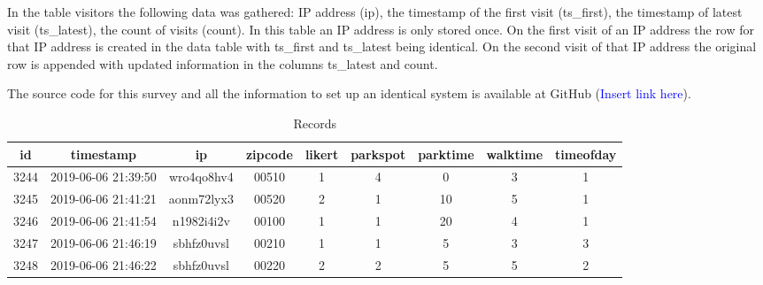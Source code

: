 In the table visitors the following data was gathered: IP address (ip), the timestamp of the first visit (ts\_first), the timestamp of latest visit (ts\_latest), the count of visits (count). In this table an IP address is only stored once. On the first visit of an IP address the row for that IP address is created in the data table with ts\_first and ts\_latest being identical. On the second visit of that IP address the original row is appended with updated information in the columns ts\_latest and count.

The source code for this survey and all the information to set up an identical system is available at GitHub (\textcolor{blue}{Insert link here}).

\begin{table}[!htbp] %
    \begin{adjustwidth}{-1cm}{-1cm} %
        \begin{centering}
            \begin{tabular}{|c c c c c c c c c|} 
                \hline
                id & timestamp & ip & zipcode & likert & parkspot & parktime & walktime & timeofday \\ [0.5ex] 
                \hline\hline
                3244 & 2019-06-06 21:39:50 & wro4qo8hv4 & 00510 & 1 & 4 & 0 & 3 & 1\\ [0.25ex]
                \hline
                3245 & 2019-06-06 21:41:21 & aonm72lyx3 & 00520 & 2 & 1 & 10 & 5 & 1 \\ [0.25ex] 
                \hline
                3246 & 2019-06-06 21:41:54 & n1982i4i2v & 00100 & 1 & 1 & 20 & 4 & 1 \\ [0.25ex] 
                \hline
                3247 & 2019-06-06 21:46:19 & sbhfz0uvsl & 00210 & 1 & 1 & 5 & 3 & 3 \\ [0.25ex] 
                \hline
                3248 & 2019-06-06 21:46:22 & sbhfz0uvsl & 00220 & 2 & 2 & 5 & 5 & 2 \\ [1ex]
                \hline
            \end{tabular}
            \caption{Records} \label{tab:recordstab}
        \end{centering}
    \end{adjustwidth}
\end{table}

